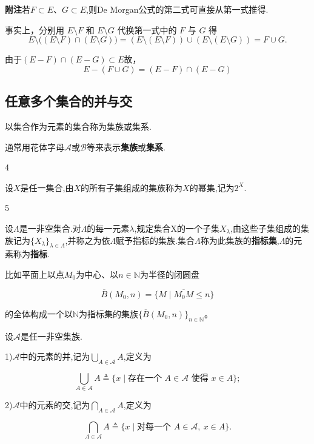 \textbf{附注}\quad 若\(F\subset E\)、\(G\subset E\),则De Morgan公式的第二式可直接从第一式推得.

事实上，分别用 $E\setminus F$ 和 $E\setminus G$ 代换第一式中的 $F$ 与 $G$ 得
\[
E \setminus \bigl((E\setminus F) \cap (E\setminus G)\bigr)
= (E \setminus (E\setminus F)) \cup (E \setminus (E\setminus G))
= F \cup G.
\]

由于$(E-F)\cap(E-G) \subset E$故，
\[
	E-(F\cup G) = (E-F)\cap(E-G)
\]

\subsection*{任意多个集合的并与交}

\begin{mydef*}{}

以集合作为元素的集合称为集族或集系.

\end{mydef*}

通常用花体字母\(\mathscr{A}\)或\(\mathscr{B}\)等来表示\textbf{集族}或\textbf{集系}.

\begin{sourceexample}{4}

设$X$是任一集合,由$X$的所有子集组成的集族称为$X$的幂集,记为\(2^X\).

\end{sourceexample}

\begin{sourceexample}{5}

设\(\Lambda\)是一非空集合.对\(\Lambda\)的每一元素\(\lambda\),规定集合X的一个子集\(X_\lambda\),由这些子集组成的集族记为\(\{X_\lambda\}_{\lambda\in\Lambda}\),并称之为依\(\Lambda\)赋予指标的集族.集合\(\Lambda\)称为此集族的\textbf{指标集},\(\Lambda\)的元素称为\textbf{指标}.

比如平面上以点\(M_0\)为中心、以\(n\in\mathbb{N}\)为半径的闭圆盘

\[\overline{B}(M_0,n)=\{M\mid \overline{M_0M}\leq n\}\]

的全体构成一个以\(\mathbb{N}\)为指标集的集族\(\{\overline{B}(M_0,n)\}_{n\in\mathbb{N}}\)。

\end{sourceexample}


\begin{mydef*}{}

设\(\mathscr{A}\)是任一非空集族.

1)\(\mathscr{A}\)中的元素的并,记为\(\bigcup_{A\in\mathscr{A}}A\),定义为

\[\bigcup_{A\in\mathscr{A}}A\mathrel{\triangleq}
\{x\mid\text{存在一个 }A\in\mathscr{A}\text{ 使得 }x\in A\};\]

2)\(\mathscr{A}\)中的元素的交,记为\(\bigcap_{A\in\mathscr{A}}A\),定义为

\[\bigcap_{A\in\mathscr{A}}A\mathrel{\triangleq}
\{x\mid\text{对每一个 }A\in\mathscr{A},\ x\in A\}.\]


\end{mydef*}


